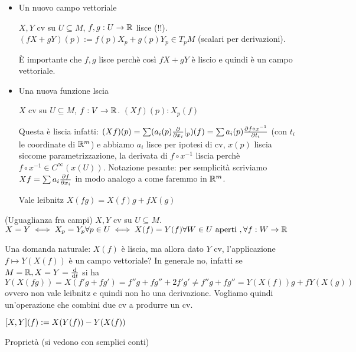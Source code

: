 \begin{itemize}
    \item Un nuovo campo vettoriale
        \begin{definition}
            $X,Y$ cv su $U\subseteq M$, $f,g:U\to\mathbb{R}$ lisce (!!).
            $(fX+gY)(p):=f(p)X_p+g(p)Y_p\in T_pM$ (scalari per
            derivazioni).
        \end{definition}
        È importante che $f,g$ lisce perchè così $fX+gY$ è liscio e
        quindi è un campo vettoriale.
    \item Una nuova funzione lscia
        \begin{definition}
            $X$ cv su $U\subseteq M$, $f:V\to\mathbb{R}$.
            $(Xf)(p):X_p(f)$
        \end{definition}
        Questa è liscia infatti:
        $(Xf)(p)=\sum(a_i(p)\pdv{x_i}|_p)(f)=
        \sum a_i(p)\pdv{f\circ x^{-1}}{t_i}(x(p))$ (con $t_i$ le
        coordinate di $\mathbb{R}^m$) e abbiamo $a_i$ lisce per ipotesi di
        cv, $x(p)$ liscia siccome parametrizzazione, la derivata 
        di $f\circ x^{-1}$ liscia perchè $f\circ x^{-1}\in
        C^{\infty}(x(U))$.
        Notazione pesante: per semplicità scriviamo
        $Xf=\sum a_i \pdv{f}{x_i}$ in modo analogo a come faremmo in
        $\mathbb{R}^m$.
                
        \begin{obs}
            Vale leibnitz $X(fg)=X(f)g+fX(g)$
        \end{obs}
\end{itemize}

\begin{definition}(Uguaglianza fra campi)
    $X,Y$ cv su $U\subseteq M$. 
    $X=Y\iff X_p=Y_p\forall p\in U\iff X(f)=Y(f)\forall W\in
    U\text{ aperti },\forall f:W\to\mathbb{R}$ 
\end{definition}

Una domanda naturale: $X(f)$ è liscia, ma allora dato $Y$ cv,
l'applicazione $f\mapsto Y(X(f))$ è un campo vettoriale? In
generale no, infatti se $M=\mathbb{R},X=Y=\dv{t}$ si ha
$Y(X(fg))=X(f'g+fg')=f''g+fg''+2f'g'\neq 
f''g+fg''=Y(X(f))g+fY(X(g))$ ovvero non vale leibnitz e quindi non
ho una derivazione. Vogliamo quindi un'operazione che combini due
cv a produrre un cv. 
\begin{definition}
    $\comm{X}{Y}(f):= X(Y(f))-Y(X(f))$
\end{definition}
Proprietà (si vedono con semplici conti)

